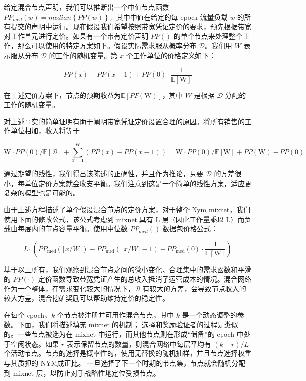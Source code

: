 \documentclass{article}
\begin{document}
	给定混合节点声明，我们可以推断出一个中值节点函数 $PP_{med}(w) = median\left \{PP(w)  \right \} $，其中中值在给定的每 epoch 流量负载 $w$ 的所有提交的声明中运行。现在假设我们希望按照带宽凭证定价的要求，预先根据带宽对工作单元进行定价。如果有一个带有定价声明 $PP()$ 的单个节点来处理整个工作，那么可以使用的特定方案如下。假设实际需求服从概率分布 $\mathcal{D}$。我们用 $W$ 表示服从分布 $\mathcal{D}$ 的工作的随机变量。第 $x$ 个工作单位的价格定义如下：

\begin{equation}\nonumber
PP(x)-P P(x-1)+P P(0) \cdot \frac{1}{\mathbb{E}[\mathrm{W}]}
\end{equation}

	在上述定价方案下，节点的预期收益为$\mathbb{E}[PP(\mathrm{W})]$，其中 $W$ 是根据 $\mathcal{D}$ 分配的工作的随机变量。

	对上述事实的简单证明有助于阐明带宽凭证定价设置合理的原因。将所有销售的工作单位相加，收入将等于：
	
\begin{equation}\nonumber
\mathrm{W} \cdot PP(0) / \mathbb{E}[\mathcal{D}]+\sum_{x=1}^{\mathrm{W}}(PP(x)-PP(x-1))=\mathrm{W} \cdot PP(0) / \mathbb{E}[\mathrm{W}]+PP(\mathrm{W})-PP(0)
\end{equation}

	通过期望的线性，我们得出该陈述的正确性，并且作为推论，只要 $\mathcal{D}$ 的方差很小，每单位定价方案就会收支平衡。我们注意到这是一个简单的线性方案，适应更复杂的模型\cite{ref5, ref67}也是可能的。\newline

	由于上述方程描述了单个假设混合节点的定价方案，对于整个 Nym mixnet，我们使用下面的修改公式，该公式考虑到 mixnet 具有 L 层（因此工作量乘以 L）而负载由每层内的节点容量平衡。使用中位数 $PP_{med}()$ 数据包价格公式：

\begin{equation}\nonumber
L \cdot\left(PP_{\operatorname{med}}(\lceil x / W\rceil)-PP_{\operatorname{med}}(\lceil x / W\rceil-1)+PP_{\operatorname{med}}(0) \cdot \frac{1}{\mathbb{E}[\mathrm{W}]}\right)
\end{equation}

	基于以上所有，我们观察到混合节点之间的微小变化、合理集中的需求函数和平滑的 $PP(·)$ 定价函数导致带宽凭证产生的总收入抵消了运营成本的情况。混合网络作为一个整体，在需求变化较大的情况下，$\mathcal{D}$ 有较大的方差，会导致节点收入的较大方差，混合挖矿奖励可以帮助维持定价的稳定性\cite{ref59}。\newline

	在每个 epoch，$k$ 个节点被注册并可用作混合节点，其中 $k$ 是一个动态调整的参数。下面，我们将描述填充 mixnet 的机制； 选择和奖励验证者的过程是类似的。一些节点被选为在 mixnet 中运行，而其他节点则在形成“储备”的 epoch 中处于空闲状态。如果 $r$ 表示保留节点的数量，则混合网络中每层平均有 $(k − r)/L$ 个活动节点。节点的选择是概率性的，使用无替换的随机抽样，并且节点选择权重与其质押的 NYM成正比。 一旦选择了下一个时期的节点集，节点就会随机分配到 mixnet 层，以防止对手战略性地定位受损节点。\newline
\end{document}
